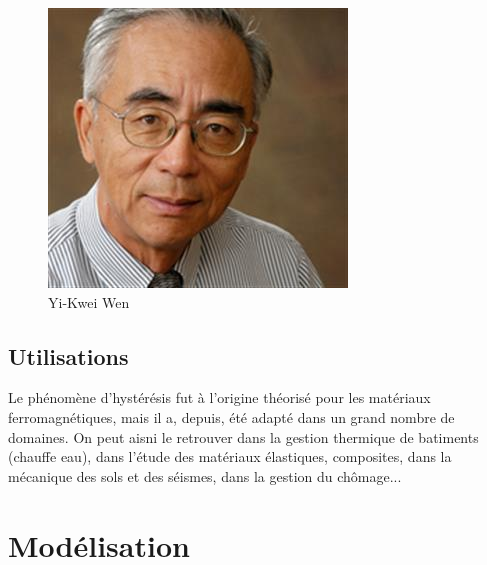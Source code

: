 \documentclass[11pt]{article}
\begin{document}
\begin{figure}[H]
\begin{minipage}{0.2\textwidth}
    \end{minipage}
    \hspace{1in}
    \begin{minipage}{0.27\textwidth}
      \centering
      \includegraphics[width=\textwidth]{Yi-Wen.jpeg}
      \caption{Yi-Kwei Wen}
    \end{minipage}
  \end{figure}
  
\subsection{Utilisations}
Le phénomène d'hystérésis fut à l'origine théorisé pour les matériaux ferromagnétiques, mais il a, depuis,
été adapté dans un grand nombre de domaines. On peut aisni le retrouver dans la gestion thermique de batiments (chauffe eau),
dans l'étude des matériaux élastiques, composites, dans la mécanique des sols et des séismes, dans la gestion du chômage... 

\section{Modélisation}
\end{document}
